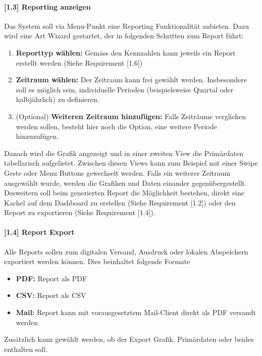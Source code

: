 \documentclass[a4paper]{scrreprt}
\begin{document}
\paragraph{[1.3] Reporting anzeigen}
Das System soll via Menu-Punkt eine Reporting Funktionalität anbieten. Dazu wird eine Art Wizard gestartet, der in folgenden Schritten zum Report führt:
\begin{enumerate}
\item \textbf{Reporttyp wählen:} Gemäss den Kennzahlen kann jeweils ein Report erstellt werden (Siehe Requirement [1.6])
\item \textbf{Zeitraum wählen:} Der Zeitraum kann frei gewählt werden. Insbesondere soll es möglich sein, individuelle Perioden (beispielsweise Quartal oder halbjährlich) zu definieren.
\item (Optional) \textbf{Weiteren Zeitraum hinzufügen:} Falls Zeiträume verglichen werden sollen, besteht hier noch die Option, eine weitere Periode hinzuzufügen.
\end{enumerate}
Danach wird die Grafik angezeigt und in einer zweiten View die Primärdaten tabellarisch aufgelistet. Zwischen diesen Views kann zum Beispiel mit einer Swipe Geste oder Menu Buttons gewechselt werden. Falls ein weiterer Zeitraum ausgewählt wurde, werden die Grafiken und Daten einander gegenübergestellt.\\
Desweitern soll beim generierten Report die Möglichkeit bestehen, direkt eine Kachel auf dem Dashboard zu erstellen (Siehe Requirement [1.2]) oder den Report zu exportieren (Siehe Requirement [1.4]).

\pagebreak

\paragraph{[1.4] Report Export}
Alle Reports sollen zum digitalen Versand, Ausdruck oder lokalen Abspeichern exportiert werden können. Dies beinhaltet folgende Formate
\begin{itemize}
\item \textbf{PDF:} Report als PDF
\item \textbf{CSV:} Report als CSV
\item \textbf{Mail:} Report kann mit vorausgesetztem Mail-Client direkt als PDF versandt werden
\end{itemize}
Zusätzlich kann gewählt werden, ob der Export Grafik, Primärdaten oder beides enthalten soll.
\end{document}
